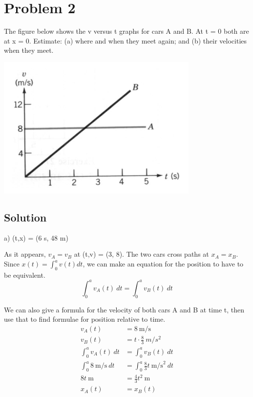 \documentclass[12pt]{article}
\begin{document}
\pagebreak
\section*{Problem 2}
The figure below shows the v versus t graphs for cars A and B. At t = 0 both are at x = 0.
Estimate: (a) where and when they meet again; and (b) their velocities when they meet.

\begin{center}
    \includegraphics*[width=10cm]{graph_2.png}
\end{center}

\subsection*{Solution}
a) (t,x) = (6 s, 48 m)

As it appears, $v_A = v_B$ at (t,v) = (3, 8). The two cars cross paths at $x_A = x_B$. Since $x(t) = \int_0^a v(t) dt$, we can make an equation for the position to have to be equivalent.
\begin{equation*}
    \int_{0}^{a} v_A(t)\ dt = \int_{0}^{a} v_B(t)\ dt
\end{equation*}

\pagebreak
We can also give a formula for the velocity of both cars A and B at time t, then use that to find formulae for position relative to time.
\begin{align*}
    v_A(t) &= 8\ \unit{\m/\s} \\
    v_B(t) &= t \cdot \frac{8}{3}\ \unit{m/s^2} \\
    \int_{0}^{a} v_A(t)\ dt &= \int_{0}^{a} v_B(t)\ dt \\
    \int_{0}^{a} 8\ \unit{\m/\s}\ dt &= \int_{0}^{a} \frac{8}{3}t\ \unit{\m/\s}^2\ dt \\
    8t\ \unit{\m} &= \frac{4}{3} t^2\ \unit{\m} \\
    x_A(t) &= x_B(t)
\end{align*}
\end{document}
